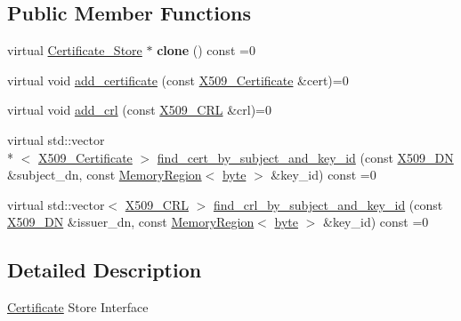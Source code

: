 \subsection*{Public Member Functions}
\begin{DoxyCompactItemize}
\item 
\hypertarget{classBotan_1_1Certificate__Store_a1cdbfb701732bd2fc15d6f10a3686484}{virtual \hyperlink{classBotan_1_1Certificate__Store}{Certificate\-\_\-\-Store} $\ast$ {\bfseries clone} () const =0}\label{classBotan_1_1Certificate__Store_a1cdbfb701732bd2fc15d6f10a3686484}

\item 
virtual void \hyperlink{classBotan_1_1Certificate__Store_a152d72d80094c94329997b292a6fc57b}{add\-\_\-certificate} (const \hyperlink{classBotan_1_1X509__Certificate}{X509\-\_\-\-Certificate} \&cert)=0
\item 
virtual void \hyperlink{classBotan_1_1Certificate__Store_a6eb66caf4cdce7f188d86f036448ccdc}{add\-\_\-crl} (const \hyperlink{classBotan_1_1X509__CRL}{X509\-\_\-\-C\-R\-L} \&crl)=0
\item 
virtual std\-::vector\\*
$<$ \hyperlink{classBotan_1_1X509__Certificate}{X509\-\_\-\-Certificate} $>$ \hyperlink{classBotan_1_1Certificate__Store_a1244b403fa34b6446e3cbfa85a43af70}{find\-\_\-cert\-\_\-by\-\_\-subject\-\_\-and\-\_\-key\-\_\-id} (const \hyperlink{classBotan_1_1X509__DN}{X509\-\_\-\-D\-N} \&subject\-\_\-dn, const \hyperlink{classBotan_1_1MemoryRegion}{Memory\-Region}$<$ \hyperlink{namespaceBotan_a7d793989d801281df48c6b19616b8b84}{byte} $>$ \&key\-\_\-id) const =0
\item 
virtual std\-::vector$<$ \hyperlink{classBotan_1_1X509__CRL}{X509\-\_\-\-C\-R\-L} $>$ \hyperlink{classBotan_1_1Certificate__Store_abd7d904a187e332e1dd96585682be56b}{find\-\_\-crl\-\_\-by\-\_\-subject\-\_\-and\-\_\-key\-\_\-id} (const \hyperlink{classBotan_1_1X509__DN}{X509\-\_\-\-D\-N} \&issuer\-\_\-dn, const \hyperlink{classBotan_1_1MemoryRegion}{Memory\-Region}$<$ \hyperlink{namespaceBotan_a7d793989d801281df48c6b19616b8b84}{byte} $>$ \&key\-\_\-id) const =0
\end{DoxyCompactItemize}


\subsection{Detailed Description}
\hyperlink{classBotan_1_1Certificate}{Certificate} Store Interface 

